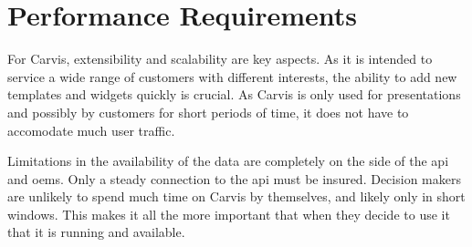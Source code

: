 \chapter{Performance Requirements}
For Carvis, extensibility and scalability are key aspects. 
As it is intended to service a wide range of customers with different interests, the ability to add new templates and widgets quickly is crucial.
As Carvis is only used for presentations and possibly by customers for short periods of time, it does not have to accomodate much user traffic.

Limitations in the availability of the \gls{data} are completely on the side of the \gls{api} and \glspl{oem}. Only a steady connection to the \gls{api} must be insured. 
Decision makers are unlikely to spend much time on Carvis by themselves, and likely only in short windows. This makes it all the more important that when they decide to use it that it is running and available.

